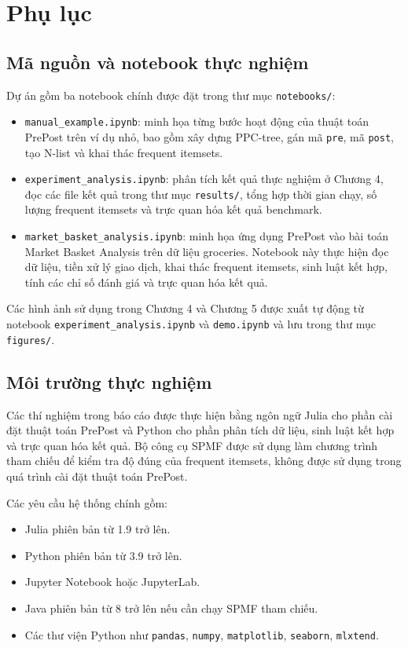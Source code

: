 \section{Phụ lục}

\subsection{Mã nguồn và notebook thực nghiệm}

Dự án gồm ba notebook chính được đặt trong thư mục \texttt{notebooks/}:

\begin{itemize}
    \item \texttt{manual\_example.ipynb}: minh họa từng bước hoạt động của thuật toán PrePost trên ví dụ nhỏ, bao gồm xây dựng PPC-tree, gán mã \texttt{pre}, mã \texttt{post}, tạo N-list và khai thác frequent itemsets.
    
    \item \texttt{experiment\_analysis.ipynb}: phân tích kết quả thực nghiệm ở Chương 4, đọc các file kết quả trong thư mục \texttt{results/}, tổng hợp thời gian chạy, số lượng frequent itemsets và trực quan hóa kết quả benchmark.
    
    \item \texttt{market\_basket\_analysis.ipynb}: minh họa ứng dụng PrePost vào bài toán Market Basket Analysis trên dữ liệu groceries. Notebook này thực hiện đọc dữ liệu, tiền xử lý giao dịch, khai thác frequent itemsets, sinh luật kết hợp, tính các chỉ số đánh giá và trực quan hóa kết quả.
\end{itemize}

Các hình ảnh sử dụng trong Chương 4 và Chương 5 được xuất tự động từ notebook \texttt{experiment\_analysis.ipynb} và \texttt{demo.ipynb} và lưu trong thư mục \texttt{figures/}.

\subsection{Môi trường thực nghiệm}

Các thí nghiệm trong báo cáo được thực hiện bằng ngôn ngữ Julia cho phần cài đặt thuật toán PrePost và Python cho phần phân tích dữ liệu, sinh luật kết hợp và trực quan hóa kết quả. Bộ công cụ SPMF được sử dụng làm chương trình tham chiếu để kiểm tra độ đúng của frequent itemsets, không được sử dụng trong quá trình cài đặt thuật toán PrePost.

Các yêu cầu hệ thống chính gồm:

\begin{itemize}
    \item Julia phiên bản từ 1.9 trở lên.
    \item Python phiên bản từ 3.9 trở lên.
    \item Jupyter Notebook hoặc JupyterLab.
    \item Java phiên bản từ 8 trở lên nếu cần chạy SPMF tham chiếu.
    \item Các thư viện Python như \texttt{pandas}, \texttt{numpy}, \texttt{matplotlib}, \texttt{seaborn}, \texttt{mlxtend}.
\end{itemize}

